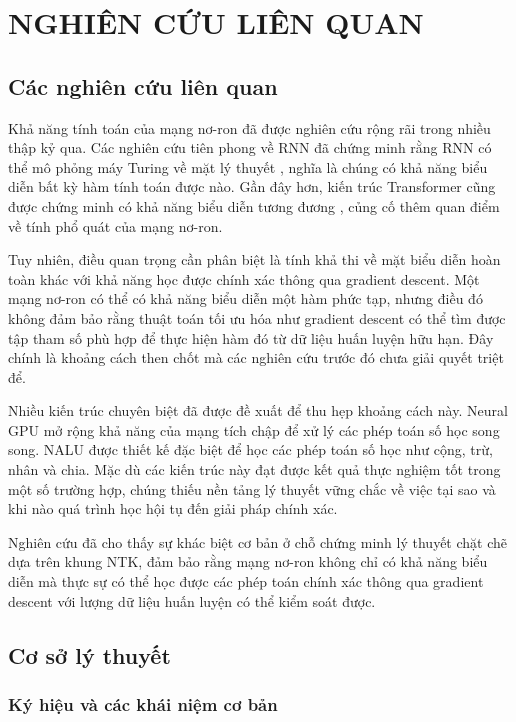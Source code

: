 \chapter{NGHIÊN CỨU LIÊN QUAN}

\section{Các nghiên cứu liên quan}

Khả năng tính toán của mạng nơ-ron đã được nghiên cứu rộng rãi trong nhiều thập kỷ qua. Các nghiên cứu tiên phong về RNN đã chứng minh rằng RNN có thể mô phỏng máy Turing về mặt lý thuyết \cite{siegelmann_sontag_1995}, nghĩa là chúng có khả năng biểu diễn bất kỳ hàm tính toán được nào. Gần đây hơn, kiến trúc Transformer cũng được chứng minh có khả năng biểu diễn tương đương \cite{perez_2021}, củng cố thêm quan điểm về tính phổ quát của mạng nơ-ron.

Tuy nhiên, điều quan trọng cần phân biệt là tính khả thi về mặt biểu diễn hoàn toàn khác với khả năng học được chính xác thông qua gradient descent. Một mạng nơ-ron có thể có khả năng biểu diễn một hàm phức tạp, nhưng điều đó không đảm bảo rằng thuật toán tối ưu hóa như gradient descent có thể tìm được tập tham số phù hợp để thực hiện hàm đó từ dữ liệu huấn luyện hữu hạn. Đây chính là khoảng cách then chốt mà các nghiên cứu trước đó chưa giải quyết triệt để.

Nhiều kiến trúc chuyên biệt đã được đề xuất để thu hẹp khoảng cách này. Neural GPU mở rộng khả năng của mạng tích chập để xử lý các phép toán số học song song. NALU được thiết kế đặc biệt để học các phép toán số học như cộng, trừ, nhân và chia. Mặc dù các kiến trúc này đạt được kết quả thực nghiệm tốt trong một số trường hợp, chúng thiếu nền tảng lý thuyết vững chắc về việc tại sao và khi nào quá trình học hội tụ đến giải pháp chính xác.

Nghiên cứu đã cho thấy sự khác biệt cơ bản ở chỗ chứng minh lý thuyết chặt chẽ dựa trên khung NTK, đảm bảo rằng mạng nơ-ron không chỉ có khả năng biểu diễn mà thực sự có thể học được các phép toán chính xác thông qua gradient descent với lượng dữ liệu huấn luyện có thể kiểm soát được.

\section{Cơ sở lý thuyết}

\subsection{Ký hiệu và các khái niệm cơ bản}

